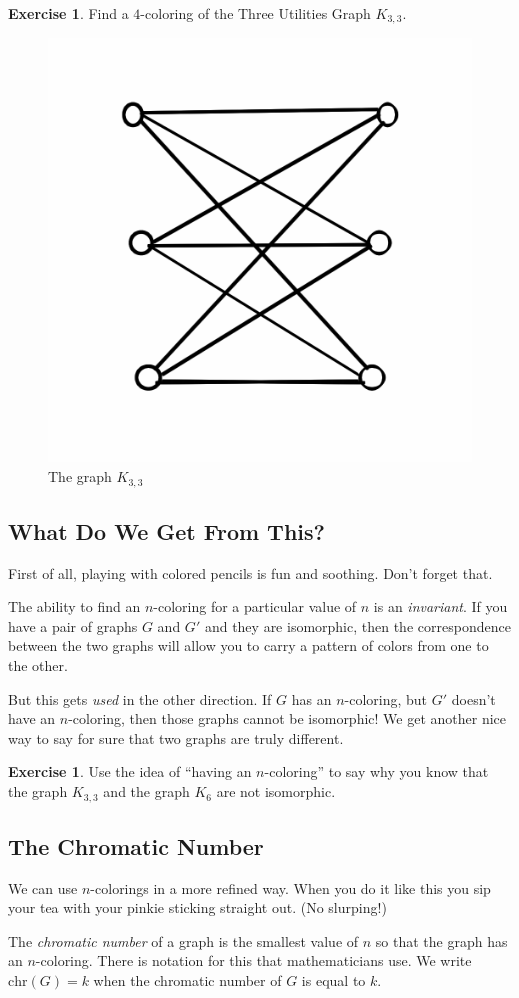 \documentclass[12pt,letterpaper]{article}
\theoremstyle{definition}
\newtheorem{exercise}[question]{Exercise}
\begin{document}
\begin{exercise}
Find a $4$-coloring of the Three Utilities Graph $K_{3,3}$.
\end{exercise}

\begin{figure}[h]
\centering
\includegraphics[width=.3\textwidth]{images/k3,3.png}
\caption{The graph $K_{3,3}$}
\label{figure:k33}
\end{figure}


\subsection*{What Do We Get From This?}

First of all, playing with colored pencils is fun and soothing. Don't forget that.

The ability to find an $n$-coloring for a particular value of $n$ is an \emph{invariant}. If you have a pair of graphs
$G$ and $G'$ and they are isomorphic, then the correspondence between the two graphs will allow you to carry
a pattern of colors from one to the other.

But this gets \emph{used} in the other direction. If $G$ has an $n$-coloring, but $G'$ doesn't have an $n$-coloring, 
then those graphs cannot be isomorphic! We get another nice way to say for sure that two graphs are truly different.

\begin{exercise}
Use the idea of ``having an $n$-coloring'' to say why you know that the graph $K_{3,3}$ and the graph $K_6$ are
not isomorphic.
\end{exercise}


\subsection*{The Chromatic Number}

We can use $n$-colorings in a more refined way. When you do it like this you sip your tea with your pinkie sticking straight out. (No slurping!)

The \emph{chromatic number} of a graph is the smallest value of $n$ so that the graph has an $n$-coloring. 
There is notation for this that mathematicians use. We write $\mathrm{chr}(G) = k$ when the chromatic number
of $G$ is equal to $k$.
\end{document}
